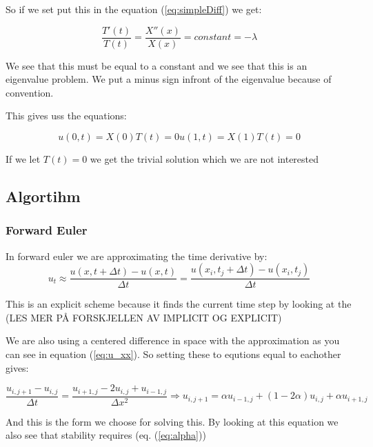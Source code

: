 \documentclass[a4paper,10pt]{article}
\begin{document}
So if we set put this in the equation (\ref{eq:simpleDiff}) we get:

\begin{equation}
\frac{T'(t)}{T(t)} = \frac{X''(x)}{X(x)} = constant = -\lambda
\label{eq:eigValue}
\end{equation}

We see that this must be equal to a constant and we see that this is an eigenvalue problem. We put a minus sign infront of the eigenvalue because
of convention.

This gives uss the equations:

\begin{equation}
u(0,t) = X(0)T(t) = 0 
u(1,t) = X(1)T(t) = 0
\label{eq:initialCond}
\end{equation}

If we let $T(t) = 0$ we get the trivial solution which we are not interested 

\subsection{Algortihm}
\subsubsection{Forward Euler}

In forward euler we are approximating the time derivative by:
\begin{equation}
u_t\approx \frac{u(x,t+\Delta t)-u(x,t)}{\Delta t}=\frac{u(x_i,t_j+\Delta t)-u(x_i,t_j)}{\Delta t}
\label{eq:forward_euler}
\end{equation}

This is an explicit scheme because it finds the current time step by looking at the (LES MER PÅ FORSKJELLEN AV IMPLICIT OG EXPLICIT)

We are also using a centered difference in space with the approximation as you can see in equation (\ref{eq:u_xx}). So setting these to equtions equal to eachother
 gives:
 
\begin{equation}
\frac{u_{i,j+1} - u_{i,j}}{\Delta t} = \frac{u_{i+1,j} - 2u_{i,j} + u_{i-1,j}}{\Delta x^2} \Rightarrow u_{i,j+1} = \alpha u_{i-1,j} + (1 -2\alpha)u_{i,j} + \alpha u_{i+1,j}
\label{eq:Forward_eulerScheme}
\end{equation}

And this is the form we choose for solving this. By looking at this equation we also see that stability requires (eq. (\ref{eq:alpha}))
\end{document}
